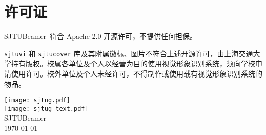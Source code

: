 \documentclass[
    UTF8,
    heading=true,
    12pt,
    a4paper
]{ctexrep}
\def\themename{\textsf{SJTUBeamer}}
\begin{document}
\chapter*{许可证}

\themename\ 符合 \href{https://github.com/sjtug/SJTUBeamer/blob/main/LICENSE}{Apache-2.0 开源许可}，不提供任何担保。

\texttt{sjtuvi} 和 \texttt{sjtucover} 库及其附属徽标、图片不符合上述开源许可，由上海交通大学持有\href{https://vi.sjtu.edu.cn/index.php/articles/bulletin/16}{版权}。校属各单位及个人以经营为目的使用视觉形象识别系统，须向学校申请使用许可。校外单位及个人未经许可，不得制作或使用载有视觉形象识别系统的物品。

\def\sjtuglogo{
  \texttt{[image: sjtug.pdf]}\\
  \vspace*{5pt}
  \texttt{[image: sjtug\_text.pdf]}
}

\vfill
{
\centering
\sjtuglogo\\
{\large \themename{}\\}
\today\\
}
\vfill
\end{document}
